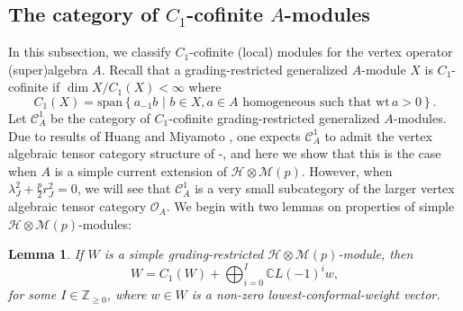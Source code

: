 \documentclass[11pt, reqno]{amsart}
\newtheorem{lem}[thm]{Lemma}
\theoremstyle{definition}\newtheorem{defi}[thm]{Definition}
\theoremstyle{definition}\newtheorem{rem}[thm]{Remark}
\theoremstyle{definition}\newtheorem{exam}[thm]{Example}
\theoremstyle{definition}\newtheorem{assum}[thm]{Assumption}
\newcommand{\cH}{\mathcal{H}}
\newcommand{\cM}{\mathcal{M}}
\newcommand{\cO}{\mathcal{O}}
\newcommand{\cC}{\mathcal{C}}
\newcommand{\CC}{\mathbb{C}}
\newcommand{\ZZ}{\mathbb{Z}}
\begin{document}
 
 \subsection{The category of \texorpdfstring{$C_1$}{C1}-cofinite \texorpdfstring{$A$}{A}-modules}\label{subsec:C1-cofinite}
 
 In this subsection, we classify $C_1$-cofinite (local) modules for the vertex operator (super)algebra $A$. Recall that a grading-restricted generalized $A$-module $X$ is $C_1$-cofinite if $\dim X/C_1(X)<\infty$ where
 \begin{equation*}
C_1(X)=\mathrm{span}\left\lbrace a_{-1} b\,\,\vert\,\,b\in X, a\in A\,\,\text{homogeneous such that}\,\,\mathrm{wt}\,a>0\right\rbrace. 
 \end{equation*}
 Let $\cC^1_A$ be the category of $C_1$-cofinite grading-restricted generalized $A$-modules. Due to results of Huang \cite{Hu-diff-eqs} and Miyamoto \cite{Miy, Miy2}, one expects $\cC^1_A$ to admit the vertex algebraic tensor category structure of \cite{HLZ1}-\cite{HLZ8}, and here we show that this is the case when $A$ is a simple current extension of $\cH\otimes\cM(p)$. However, when $\lambda_J^2+\frac{p}{2}r_J^2=0$, we will see that $\cC^1_A$ is a very small subcategory of the larger vertex algebraic tensor category $\cO_A$. We begin with two lemmas on properties of simple $\cH\otimes\cM(p)$-modules:
 \begin{lem}\label{lem:H_times_M(p)_C1_cofinite}
 If $W$ is a simple grading-restricted $\cH\otimes\cM(p)$-module,  then
 \begin{equation*}
 W = C_1(W)+\bigoplus_{i=0}^I \CC L(-1)^i w,
 \end{equation*}
 for some $I\in\ZZ_{\geq 0}$, where $w\in W$ is a non-zero lowest-conformal-weight vector.
 \end{lem}
 
\end{document}

